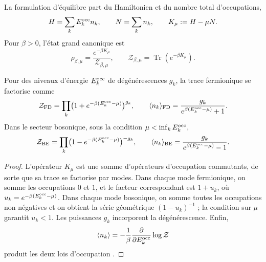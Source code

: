 La formulation d’équilibre part du Hamiltonien et du nombre total
d’occupations,
\begin{equation}
 H=\sum_kE_k^{\rm occ} n_k,
 \qquad
 N=\sum_k n_k,
 \qquad
 K_\mu:=H-\mu N.
 \label{v:rec:eq:hamiltoniano-gran-canonico-rev3}
\end{equation}
Pour \(\beta>0\), l’état grand canonique est
\begin{equation}
 \rho_{\beta,\mu}
 =\frac{e^{-\beta K_\mu}}{\mathcal Z_{\beta,\mu}},
 \qquad
 \mathcal Z_{\beta,\mu}
 =\operatorname{Tr}(e^{-\beta K_\mu}).
 \label{v:rec:eq:estado-gran-canonico-rev3}
\end{equation}

\begin{theorem}
\label{v:rec:thm:factorizacion-gran-canonica-rev3}
Pour des niveaux d’énergie \(E_k^{\rm occ}\) de dégénérescences \(g_k\), la
trace fermionique se factorise comme
\begin{equation}
 \mathcal Z_{\rm FD}
 =\prod_k\bigl(1+e^{-\beta(E_k^{\rm occ}-\mu)}\bigr)^{g_k},
 \qquad
 \langle n_k\rangle_{\rm FD}
 =\frac{g_k}{e^{\beta(E_k^{\rm occ}-\mu)}+1}.
 \label{v:rec:eq:factorizacion-fd-rev3}
\end{equation}
Dans le secteur bosonique, sous la condition
\(\mu<\inf_kE_k^{\rm occ}\),
\begin{equation}
 \mathcal Z_{\rm BE}
 =\prod_k\bigl(1-e^{-\beta(E_k^{\rm occ}-\mu)}\bigr)^{-g_k},
 \qquad
 \langle n_k\rangle_{\rm BE}
 =\frac{g_k}{e^{\beta(E_k^{\rm occ}-\mu)}-1}.
 \label{v:rec:eq:factorizacion-be-rev3}
\end{equation}
\end{theorem}

\begin{proof}
L’opérateur \(K_\mu\) est une somme d’opérateurs d’occupation commutants, de
sorte que sa trace se factorise par modes. Dans chaque mode fermionique, on somme les
occupations \(0\) et \(1\), et le facteur correspondant est
\(1+u_k\), où
\(u_k=e^{-\beta(E_k^{\rm occ}-\mu)}\). Dans chaque mode bosonique, on somme toutes
les occupations non négatives et on obtient la série géométrique
\((1-u_k)^{-1}\) ; la condition sur \(\mu\) garantit \(u_k<1\). Les
puissances \(g_k\) incorporent la dégénérescence. Enfin,
\[
 \langle n_k\rangle
 =-\frac1\beta\frac{\partial}{\partial E_k^{\rm occ}}
   \log\mathcal Z
\]
produit les deux lois d’occupation
\cite{Bose1924,Einstein1924,Fermi1926,Dirac1926,Pathria2011}.
\end{proof}

